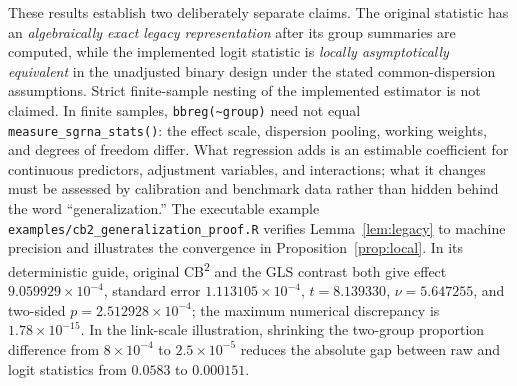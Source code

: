 These results establish two deliberately separate claims.  The original
statistic has an \emph{algebraically exact legacy representation} after its
group summaries are computed, while the implemented logit statistic is
\emph{locally asymptotically equivalent} in the unadjusted binary design under
the stated common-dispersion assumptions.  Strict finite-sample nesting of the
implemented estimator is not claimed.  In finite samples,
\texttt{bbreg(\textasciitilde group)} need not equal
\texttt{measure\_sgrna\_stats()}: the effect scale, dispersion pooling,
working weights, and degrees of freedom differ.  What regression adds is an
estimable coefficient for continuous predictors, adjustment variables, and
interactions; what it changes must be assessed by calibration and benchmark
data rather than hidden behind the word ``generalization.''  The executable
example \texttt{examples/cb2\_generalization\_proof.R} verifies
Lemma~\ref{lem:legacy} to machine precision and illustrates the
convergence in Proposition~\ref{prop:local}.  In its deterministic guide,
original CB\textsuperscript{2} and the GLS contrast both give effect
$9.059929\times10^{-4}$, standard error $1.113105\times10^{-4}$,
$t=8.139330$, $\nu=5.647255$, and two-sided
$p=2.512928\times10^{-4}$; the maximum numerical discrepancy is
$1.78\times10^{-15}$.  In the link-scale illustration, shrinking the
two-group proportion difference from $8\times10^{-4}$ to
$2.5\times10^{-5}$ reduces the absolute gap between raw and logit statistics
from $0.0583$ to $0.000151$.
